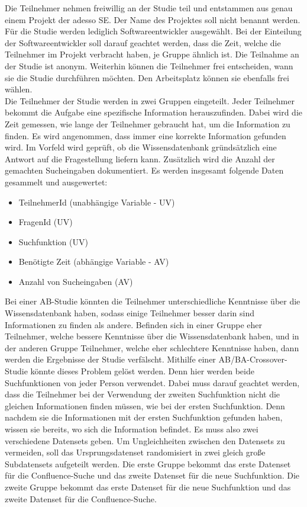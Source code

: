 Die Teilnehmer nehmen freiwillig an der Studie teil und entstammen aus genau einem Projekt der adesso SE.
Der Name des Projektes soll nicht benannt werden.
Für die Studie werden lediglich Softwareentwickler ausgewählt.
Bei der Einteilung der Softwareentwickler soll darauf geachtet werden, dass die Zeit, welche die Teilnehmer im Projekt verbracht haben, je Gruppe ähnlich ist.
Die Teilnahme an der Studie ist anonym.
Weiterhin können die Teilnehmer frei entscheiden, wann sie die Studie durchführen möchten.
Den Arbeitsplatz können sie ebenfalls frei wählen.\\

Die Teilnehmer der Studie werden in zwei Gruppen eingeteilt.
Jeder Teilnehmer bekommt die Aufgabe eine spezifische Information herauszufinden.
Dabei wird die Zeit gemessen, wie lange der Teilnehmer gebraucht hat, um die Information zu finden.
Es wird angenommen, dass immer eine korrekte Information gefunden wird.
Im Vorfeld wird geprüft, ob die Wissensdatenbank gründsätzlich eine Antwort auf die Fragestellung liefern kann. 
Zusätzlich wird die Anzahl der gemachten Sucheingaben dokumentiert.
Es werden insgesamt folgende Daten gesammelt und ausgewertet:
\begin{itemize}
    \item TeilnehmerId (unabhängige Variable - UV)
    \item FragenId (UV)
    \item Suchfunktion (UV)
    \item Benötigte Zeit (abhängige Variable - AV)
    \item Anzahl von Sucheingaben (AV)
\end{itemize}

Bei einer AB-Studie könnten die Teilnehmer unterschiedliche Kenntnisse über die Wissensdatenbank haben, sodass einige Teilnehmer besser darin sind Informationen zu finden als andere.
Befinden sich in einer Gruppe eher Teilnehmer, welche bessere Kenntnisse über die Wissensdatenbank haben, und in der anderen Gruppe Teilnehmer, welche eher schlechtere Kenntnisse haben, dann werden die Ergebnisse der Studie verfälscht.
Mithilfe einer AB/BA-Crossover-Studie könnte dieses Problem gelöst werden.
Denn hier werden beide Suchfunktionen von jeder Person verwendet.
Dabei muss darauf geachtet werden, dass die Teilnehmer bei der Verwendung der zweiten Suchfunktion nicht die gleichen Informationen finden müssen, wie bei der ersten Suchfunktion.
Denn nachdem sie die Informationen mit der ersten Suchfunktion gefunden haben, wissen sie bereits, wo sich die Information befindet.
Es muss also zwei verschiedene Datensets geben.
Um Ungleichheiten zwischen den Datensets zu vermeiden, soll das Ursprungsdatenset randomisiert in zwei gleich große Subdatensets aufgeteilt werden.
Die erste Gruppe bekommt das erste Datenset für die Confluence-Suche und das zweite Datenset für die neue Suchfunktion.
Die zweite Gruppe bekommt das erste Datenset für die neue Suchfunktion und das zweite Datenset für die Confluence-Suche.\\

